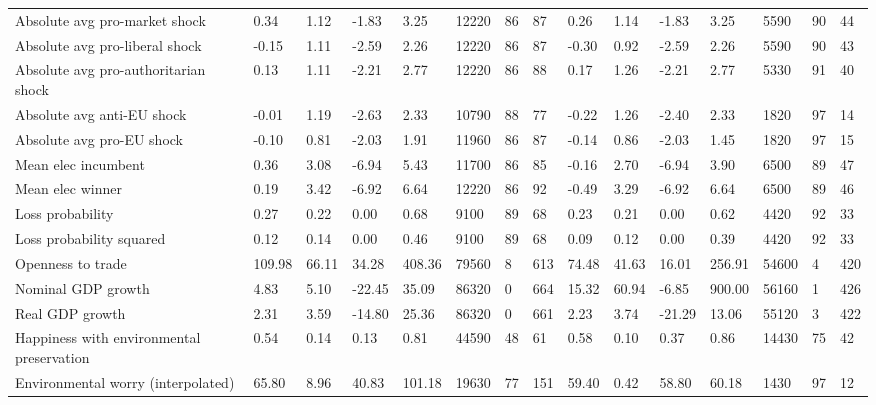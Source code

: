 \begin{longtable}{lllllllllllllll}
Absolute avg pro-market shock & 0.34 & 1.12 & -1.83 & 3.25 & 12220 & 86 & 87 & 0.26 & 1.14 & -1.83 & 3.25 & 5590 & 90 & 44\\
Absolute avg pro-liberal shock & -0.15 & 1.11 & -2.59 & 2.26 & 12220 & 86 & 87 & -0.30 & 0.92 & -2.59 & 2.26 & 5590 & 90 & 43\\
Absolute avg pro-authoritarian shock & 0.13 & 1.11 & -2.21 & 2.77 & 12220 & 86 & 88 & 0.17 & 1.26 & -2.21 & 2.77 & 5330 & 91 & 40\\
Absolute avg anti-EU shock & -0.01 & 1.19 & -2.63 & 2.33 & 10790 & 88 & 77 & -0.22 & 1.26 & -2.40 & 2.33 & 1820 & 97 & 14\\
\addlinespace
Absolute avg pro-EU shock & -0.10 & 0.81 & -2.03 & 1.91 & 11960 & 86 & 87 & -0.14 & 0.86 & -2.03 & 1.45 & 1820 & 97 & 15\\
Mean elec incumbent & 0.36 & 3.08 & -6.94 & 5.43 & 11700 & 86 & 85 & -0.16 & 2.70 & -6.94 & 3.90 & 6500 & 89 & 47\\
Mean elec winner & 0.19 & 3.42 & -6.92 & 6.64 & 12220 & 86 & 92 & -0.49 & 3.29 & -6.92 & 6.64 & 6500 & 89 & 46\\
Loss probability & 0.27 & 0.22 & 0.00 & 0.68 & 9100 & 89 & 68 & 0.23 & 0.21 & 0.00 & 0.62 & 4420 & 92 & 33\\
Loss probability squared & 0.12 & 0.14 & 0.00 & 0.46 & 9100 & 89 & 68 & 0.09 & 0.12 & 0.00 & 0.39 & 4420 & 92 & 33\\
\addlinespace
Openness to trade & 109.98 & 66.11 & 34.28 & 408.36 & 79560 & 8 & 613 & 74.48 & 41.63 & 16.01 & 256.91 & 54600 & 4 & 420\\
Nominal GDP growth & 4.83 & 5.10 & -22.45 & 35.09 & 86320 & 0 & 664 & 15.32 & 60.94 & -6.85 & 900.00 & 56160 & 1 & 426\\
Real GDP growth & 2.31 & 3.59 & -14.80 & 25.36 & 86320 & 0 & 661 & 2.23 & 3.74 & -21.29 & 13.06 & 55120 & 3 & 422\\
Happiness with environmental preservation & 0.54 & 0.14 & 0.13 & 0.81 & 44590 & 48 & 61 & 0.58 & 0.10 & 0.37 & 0.86 & 14430 & 75 & 42\\
Environmental worry (interpolated) & 65.80 & 8.96 & 40.83 & 101.18 & 19630 & 77 & 151 & 59.40 & 0.42 & 58.80 & 60.18 & 1430 & 97 & 12\\
\bottomrule
\end{longtable}
